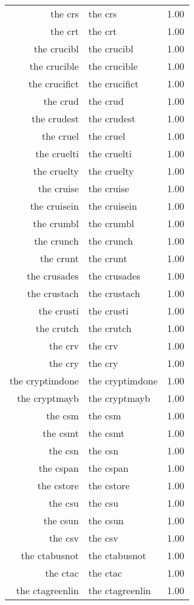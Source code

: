 \begin{table}[ht]
\begin{tabular}{rlr}
  the crs & the crs & 1.00 \\ 
  the crt & the crt & 1.00 \\ 
  the crucibl & the crucibl & 1.00 \\ 
  the crucible & the crucible & 1.00 \\ 
  the crucifict & the crucifict & 1.00 \\ 
  the crud & the crud & 1.00 \\ 
  the crudest & the crudest & 1.00 \\ 
  the cruel & the cruel & 1.00 \\ 
  the cruelti & the cruelti & 1.00 \\ 
  the cruelty & the cruelty & 1.00 \\ 
  the cruise & the cruise & 1.00 \\ 
  the cruisein & the cruisein & 1.00 \\ 
  the crumbl & the crumbl & 1.00 \\ 
  the crunch & the crunch & 1.00 \\ 
  the crunt & the crunt & 1.00 \\ 
  the crusades & the crusades & 1.00 \\ 
  the crustach & the crustach & 1.00 \\ 
  the crusti & the crusti & 1.00 \\ 
  the crutch & the crutch & 1.00 \\ 
  the crv & the crv & 1.00 \\ 
  the cry & the cry & 1.00 \\ 
  the cryptimdone & the cryptimdone & 1.00 \\ 
  the cryptmayb & the cryptmayb & 1.00 \\ 
  the csm & the csm & 1.00 \\ 
  the csmt & the csmt & 1.00 \\ 
  the csn & the csn & 1.00 \\ 
  the cspan & the cspan & 1.00 \\ 
  the cstore & the cstore & 1.00 \\ 
  the csu & the csu & 1.00 \\ 
  the csun & the csun & 1.00 \\ 
  the csv & the csv & 1.00 \\ 
  the ctabusnot & the ctabusnot & 1.00 \\ 
  the ctac & the ctac & 1.00 \\ 
  the ctagreenlin & the ctagreenlin & 1.00 \\ 

\end{tabular}
\end{table}
